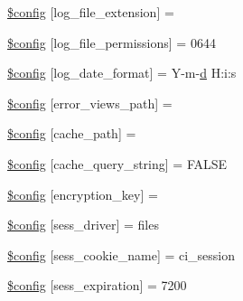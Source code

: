 \begin{DoxyCompactItemize}
\item 
\hyperlink{_admin_2application_2config_2config_8php_a393732deb535f26741ab9dcec545be0d}{\$config} \mbox{[}\textquotesingle{}log\+\_\+file\+\_\+extension\textquotesingle{}\mbox{]} = \textquotesingle{}\textquotesingle{}
\item 
\hyperlink{_admin_2application_2config_2config_8php_adda49cab39a767472dca528204e5753b}{\$config} \mbox{[}\textquotesingle{}log\+\_\+file\+\_\+permissions\textquotesingle{}\mbox{]} = 0644
\item 
\hyperlink{_admin_2application_2config_2config_8php_a9cc05811c32c13c55ed407435a3a31b6}{\$config} \mbox{[}\textquotesingle{}log\+\_\+date\+\_\+format\textquotesingle{}\mbox{]} = \textquotesingle{}Y-\/m-\/\hyperlink{_admin_2assets_2js_2bootstrap_8min_8js_aeb337d295abaddb5ec3cb34cc2e2bbc9}{d} H\+:i\+:s\textquotesingle{}
\item 
\hyperlink{_admin_2application_2config_2config_8php_a3e989981477279a1389c9295c4a5f324}{\$config} \mbox{[}\textquotesingle{}error\+\_\+views\+\_\+path\textquotesingle{}\mbox{]} = \textquotesingle{}\textquotesingle{}
\item 
\hyperlink{_admin_2application_2config_2config_8php_ae3a5dd52b4d040adb6461b9a17d1e0f0}{\$config} \mbox{[}\textquotesingle{}cache\+\_\+path\textquotesingle{}\mbox{]} = \textquotesingle{}\textquotesingle{}
\item 
\hyperlink{_admin_2application_2config_2config_8php_ae6508d6fa180ae0a584d6ccb03189372}{\$config} \mbox{[}\textquotesingle{}cache\+\_\+query\+\_\+string\textquotesingle{}\mbox{]} = F\+A\+L\+S\+E
\item 
\hyperlink{_admin_2application_2config_2config_8php_aefa5c9d6e7a454a6218df87e65796357}{\$config} \mbox{[}\textquotesingle{}encryption\+\_\+key\textquotesingle{}\mbox{]} = \textquotesingle{}\textquotesingle{}
\item 
\hyperlink{_admin_2application_2config_2config_8php_afcd06246e5564eb457c8959af88c34f1}{\$config} \mbox{[}\textquotesingle{}sess\+\_\+driver\textquotesingle{}\mbox{]} = \textquotesingle{}files\textquotesingle{}
\item 
\hyperlink{_admin_2application_2config_2config_8php_acaf9fb6347a03527f4b04198d6d8155b}{\$config} \mbox{[}\textquotesingle{}sess\+\_\+cookie\+\_\+name\textquotesingle{}\mbox{]} = \textquotesingle{}ci\+\_\+session\textquotesingle{}
\item 
\hyperlink{_admin_2application_2config_2config_8php_ad6a3784cad81991936465dcdac74b66a}{\$config} \mbox{[}\textquotesingle{}sess\+\_\+expiration\textquotesingle{}\mbox{]} = 7200

\end{DoxyCompactItemize}
